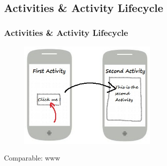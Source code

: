 \documentclass{beamer}
\begin{document}
\subsection{Activities \& Activity Lifecycle}

\begin{frame}
	\frametitle{Activities \& Activity Lifecycle}
	
	\begin{figure}
		\centering
			\includegraphics[width=0.6\textwidth]{img/activitySketch.jpg}
		\label{fig:activitySketch}
	\end{figure}
	\pause
	
	\begin{center}
	Comparable: www 
	\end{center}
\end{frame}
\end{document}
